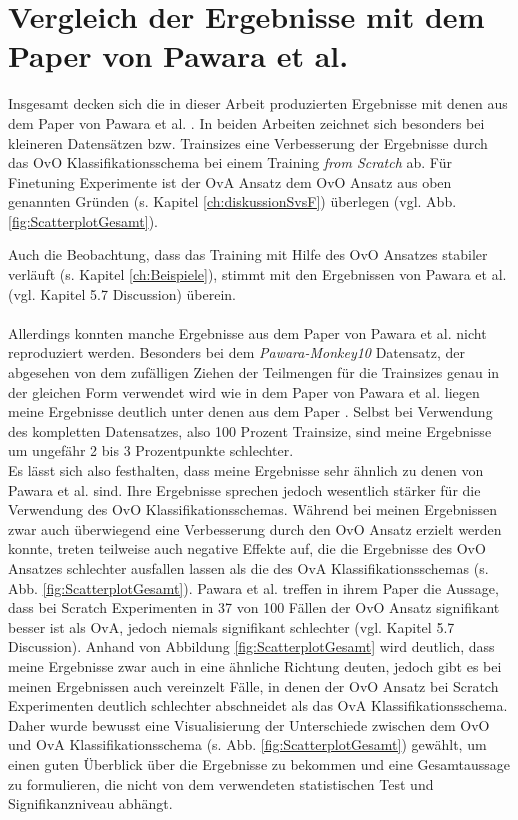 \newpage

\section{Vergleich der Ergebnisse mit dem Paper von Pawara et al. \cite{pawaraPaper}}
Insgesamt decken sich die in dieser Arbeit produzierten Ergebnisse mit denen aus dem Paper von Pawara et al. \cite{pawaraPaper}. In beiden Arbeiten zeichnet sich besonders bei kleineren Datensätzen bzw. Trainsizes eine Verbesserung der Ergebnisse durch das OvO Klassifikationsschema bei einem Training \textit{from Scratch} ab. Für Finetuning Experimente ist der OvA Ansatz dem OvO Ansatz aus oben genannten Gründen (s. Kapitel \ref{ch:diskussionSvsF}) überlegen (vgl. Abb. \ref{fig:ScatterplotGesamt}).

Auch die Beobachtung, dass das Training mit Hilfe des OvO Ansatzes stabiler verläuft (s. Kapitel \ref{ch:Beispiele}), stimmt mit den Ergebnissen von Pawara et al. (vgl. \cite{pawaraPaper} Kapitel 5.7 Discussion) überein.\\\\

Allerdings konnten manche Ergebnisse aus dem Paper von Pawara et al. \cite{pawaraPaper} nicht reproduziert werden. Besonders bei dem \textit{Pawara-Monkey10} Datensatz, der abgesehen von dem zufälligen Ziehen der Teilmengen für die Trainsizes genau in der gleichen Form verwendet wird wie in dem Paper von Pawara et al. \cite{pawaraPaper} liegen meine Ergebnisse deutlich unter denen aus dem Paper \cite{pawaraPaper}. Selbst bei Verwendung des kompletten Datensatzes, also 100 Prozent Trainsize, sind meine Ergebnisse um ungefähr 2 bis 3 Prozentpunkte schlechter.\\

Es lässt sich also festhalten, dass meine Ergebnisse sehr ähnlich zu denen von Pawara et al. \cite{pawaraPaper} sind. Ihre Ergebnisse sprechen jedoch wesentlich stärker für die Verwendung des OvO Klassifikationsschemas. Während bei meinen Ergebnissen zwar auch überwiegend eine Verbesserung durch den OvO Ansatz erzielt werden konnte, treten teilweise auch negative Effekte auf, die die Ergebnisse des OvO Ansatzes schlechter ausfallen lassen als die des OvA Klassifikationsschemas (s. Abb. \ref{fig:ScatterplotGesamt}). Pawara et al. \cite{pawaraPaper} treffen in ihrem Paper die Aussage, dass bei Scratch Experimenten in 37 von 100 Fällen der OvO Ansatz signifikant besser ist als OvA, jedoch niemals signifikant schlechter (vgl. \cite{pawaraPaper} Kapitel 5.7 Discussion).
Anhand von Abbildung \ref{fig:ScatterplotGesamt} wird deutlich, dass meine Ergebnisse zwar auch in eine ähnliche Richtung deuten, jedoch gibt es bei meinen Ergebnissen auch vereinzelt Fälle, in denen der OvO Ansatz bei Scratch Experimenten deutlich schlechter abschneidet als das OvA Klassifikationsschema.\\
Daher wurde bewusst eine Visualisierung der Unterschiede zwischen dem OvO und OvA Klassifikationsschema (s. Abb. \ref{fig:ScatterplotGesamt}) gewählt, um einen guten Überblick über die Ergebnisse zu bekommen und eine Gesamtaussage zu formulieren, die nicht von dem verwendeten statistischen Test und Signifikanzniveau abhängt.